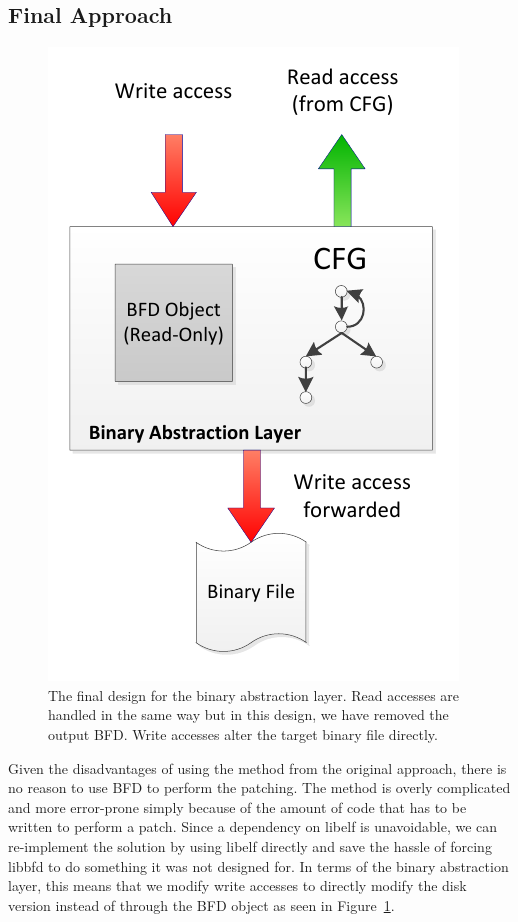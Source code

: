 \subsection{Final Approach}

\begin{figure}[H]
 \centering
 \includegraphics{Binary_Abstraction_Layer_Final.pdf}
 \caption{The final design for the binary abstraction layer. Read accesses are handled in the same way but in this design, we have removed the output BFD. Write accesses alter the target binary file directly.}
\label{fig:BAL_Final}
\end{figure}

Given the disadvantages of using the method from the original approach, there is no reason to use BFD to perform the patching. The method is overly complicated and more error-prone simply because of the amount of code that has to be written to perform a patch. Since a dependency on libelf is unavoidable, we can re-implement the solution by using libelf directly and save the hassle of forcing libbfd to do something it was not designed for. In terms of the binary abstraction layer, this means that we modify write accesses to directly modify the disk version instead of through the BFD object as seen in Figure~\ref{fig:BAL_Final}.
 
